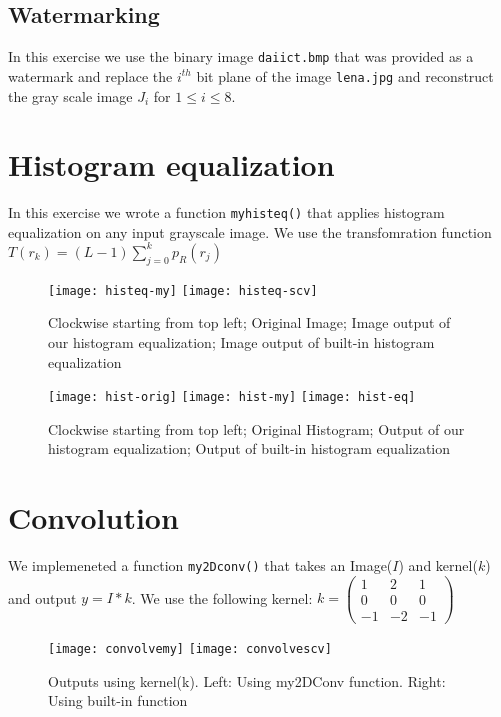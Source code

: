 \documentclass[paper=a4, fontsize=11pt]{scrartcl} %
\numberwithin{equation}{section} %
\numberwithin{figure}{section} %
\numberwithin{table}{section} %
\begin{document}

    \subsection{Watermarking}
    In this exercise we use the binary image \texttt{daiict.bmp} that was provided as a watermark and replace the \(i^{th}\) bit plane of the image \texttt{lena.jpg} and reconstruct the gray scale image \(J_i\) for \(1 \leq i \leq 8\).

\section{Histogram equalization}
    In this exercise we wrote a function \texttt{myhisteq()} that applies histogram equalization on any input grayscale image. 
    We use the transfomration function \\\(T(r_k) = (L-1)\sum_{j=0}^{k}p_R({r_j})\)

     \begin{figure}[h!]
        \centering
        \texttt{[image: histeq-my]}
        \texttt{[image: histeq-scv]}
        \caption{Clockwise starting from top left; Original Image; Image output of our histogram equalization; Image output of built-in histogram equalization}
    \end{figure}
    \begin{figure}[h!]
        \centering
        \texttt{[image: hist-orig]}
        \texttt{[image: hist-my]}
        \texttt{[image: hist-eq]}
        \caption{Clockwise starting from top left; Original Histogram; Output of our histogram equalization; Output of built-in histogram equalization}
    \end{figure}

\section{Convolution}
We implemeneted a function \texttt{my2Dconv()} that takes an Image(\(I\)) and kernel(\(k\)) and output \(y=I*k\).         
We use the following kernel:
\(k = \begin{pmatrix}
            1 & 2 & 1 \\
            0 & 0 & 0 \\
            -1 & -2 & -1
            \end{pmatrix}
\)
    \begin{figure}[h!]
        \centering
        \texttt{[image: convolvemy]}
        \texttt{[image: convolvescv]}
        \caption{Outputs using kernel(k). Left: Using my2DConv function. Right: Using built-in function}
    \end{figure}
\end{document}
